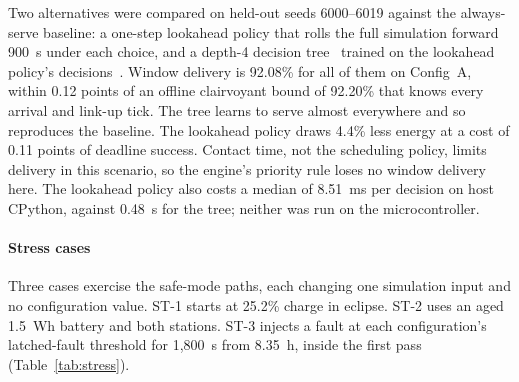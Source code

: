 \documentclass[preprint,12pt]{elsarticle}
\newcommand{\cfgA}{Config~A}
\begin{document}
Two alternatives were compared on held-out seeds 6000--6019 against the always-serve baseline: a one-step lookahead policy that rolls the full simulation forward 900~s under each choice, and a depth-4 decision tree~\cite{Quinlan1986ID3} trained on the lookahead policy's decisions~\cite{Hussein2017Imitation}. Window delivery is 92.08\% for all of them on \cfgA{}, within 0.12 points of an offline clairvoyant bound of 92.20\% that knows every arrival and link-up tick. The tree learns to serve almost everywhere and so reproduces the baseline. The lookahead policy draws 4.4\% less energy at a cost of 0.11 points of deadline success. Contact time, not the scheduling policy, limits delivery in this scenario, so the engine's priority rule loses no window delivery here. The lookahead policy also costs a median of 8.51~ms per decision on host CPython, against 0.48~\textmu s for the tree; neither was run on the microcontroller.

\paragraph{Stress cases}\label{sec:stress} Three cases exercise the safe-mode paths, each changing one simulation input and no configuration value. ST-1 starts at 25.2\% charge in eclipse. ST-2 uses an aged 1.5~Wh battery and both stations. ST-3 injects a fault at each configuration's latched-fault threshold for 1,800~s from 8.35~h, inside the first pass (Table~\ref{tab:stress}).

\begin{table}[t]
\centering
\small
\caption{Battery and fault stress cases, seed 42.}
\label{tab:stress}
\end{table}
\end{document}
